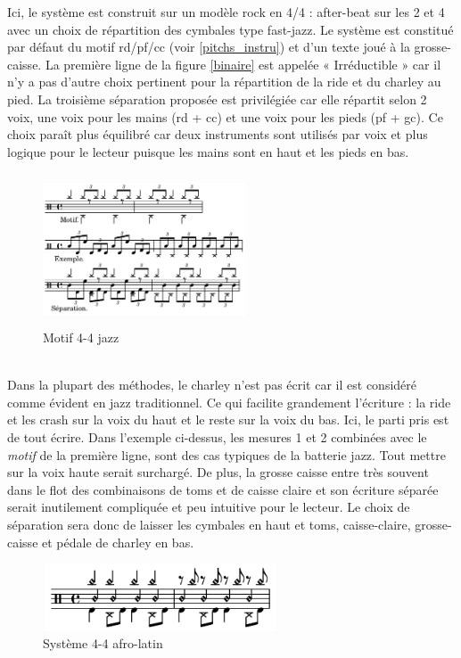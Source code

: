 Ici, le système est construit sur un modèle rock en 4/4 : after-beat sur les 2 et 4 avec un choix de répartition des cymbales type fast-jazz. Le système est constitué par défaut du motif rd/pf/cc (voir \ref{pitchs_instru}) et d’un texte joué à la grosse-caisse. La première ligne de la figure \ref{binaire} est appelée « Irréductible » car il n’y a pas d’autre choix pertinent pour la répartition de la ride et du charley au pied. La troisième séparation proposée est privilégiée car elle répartit selon 2 voix, une voix pour les mains (rd + cc) et une voix pour les pieds (pf + gc). Ce choix paraît plus équilibré car deux instruments sont utilisés par voix et plus logique pour le lecteur puisque les mains sont en haut et les pieds en bas.
\begin{figure}[h]
	\centering
	\includegraphics[height=45mm, width=60mm]{z_images/3_methodes/2_systemes/2_separation_4-4_jazz.png}
	\caption{Motif 4-4 jazz}
	\label{jazz}
\end{figure}\\
Dans la plupart des méthodes, le charley n’est pas écrit car il est considéré comme évident en jazz traditionnel. Ce qui facilite grandement l’écriture : la ride et les crash sur la voix du haut et le reste sur la voix du bas. Ici, le parti pris est de tout écrire. 
Dans l’exemple ci-dessus, 
les mesures 1 et 2 combinées avec le \textit{motif} de la première ligne, sont des cas typiques de la batterie jazz. Tout mettre sur la voix haute serait surchargé. De plus, la grosse caisse entre très souvent dans le flot des combinaisons de toms et de caisse claire et son écriture séparée serait inutilement compliquée et peu intuitive pour le lecteur. Le choix de séparation sera donc de laisser les cymbales en haut et toms, caisse-claire, grosse-caisse et pédale de charley en bas.

\begin{figure}[h]
	\centering
	\includegraphics[height=20mm, width=70mm]{z_images/3_methodes/2_systemes/3_separation_afro-latins.png}
	\caption{Système 4-4 afro-latin}
	\label{afro_latin}
\end{figure}

